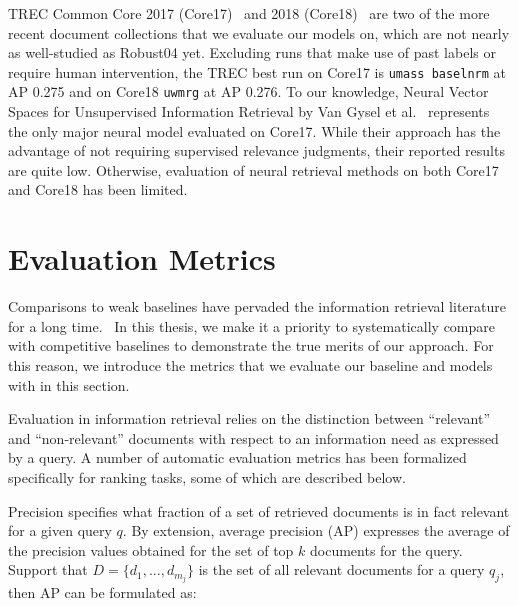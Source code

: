 TREC Common Core 2017 (Core17)~\cite{allan2017trec} and 2018 (Core18)~\cite{core2018trec} are two of the more recent document collections that we evaluate our models on, which are not nearly as well-studied as Robust04 yet.
Excluding runs that make use of past labels or require human intervention, the TREC best run on Core17 is \texttt{umass baselnrm} at AP 0.275 and on Core18 \texttt{uwmrg} at AP 0.276.
To our knowledge, Neural Vector Spaces for Unsupervised Information Retrieval by Van Gysel et al.~\cite{Gysel:2018:NVS:3211967.3196826} represents the only major neural model evaluated on Core17.
While their approach has the advantage of not requiring supervised relevance judgments, their reported results are quite low.
Otherwise, evaluation of neural retrieval methods on both Core17 and Core18 has been limited.

\section{Evaluation Metrics}

Comparisons to weak baselines have pervaded the information retrieval literature for a long time.~\cite{Armstrong_etal_CIKM2009, lin2019neural}
In this thesis, we make it a priority to systematically compare with competitive baselines to demonstrate the true merits of our approach.
For this reason, we introduce the metrics that we evaluate our baseline and models with in this section.

Evaluation in information retrieval relies on the distinction between ``relevant'' and ``non-relevant'' documents with respect to an information need as expressed by a query.
A number of automatic evaluation metrics has been formalized specifically for ranking tasks, some of which are described below.


\smallskip {}

Precision specifies what fraction of a set of retrieved documents is in fact relevant for a given query $ q $.
By extension, average precision (AP) expresses the average of the precision values obtained for the set of top $ k $ documents for the query.
Support that $ D = \{d_1, ..., d_{m_j}\} $ is the set of all relevant documents for a query $ q_j $, then AP can be formulated as:

